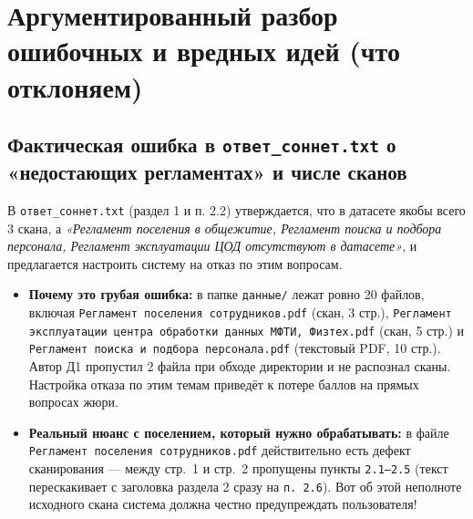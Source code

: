 \documentclass[10pt,a4paper]{article}
\begin{document}
\section{Аргументированный разбор ошибочных и вредных идей (что отклоняем)}

\subsection{Фактическая ошибка в \texttt{ответ\_соннет.txt} о «недостающих регламентах» и числе сканов}
В \texttt{ответ\_соннет.txt} (раздел 1 и п. 2.2) утверждается, что в датасете якобы всего 3 скана, а \emph{«Регламент поселения в общежитие, Регламент поиска и подбора персонала, Регламент эксплуатации ЦОД отсутствуют в датасете»}, и предлагается настроить систему на отказ по этим вопросам.
\begin{itemize}
    \item \textbf{Почему это грубая ошибка:} в папке \texttt{данные/} лежат ровно 20 файлов, включая \texttt{Регламент поселения сотрудников.pdf} (скан, 3 стр.), \texttt{Регламент эксплуатации центра обработки данных МФТИ, Физтех.pdf} (скан, 5 стр.) и \texttt{Регламент поиска и подбора персонала.pdf} (текстовый PDF, 10 стр.). Автор Д1 пропустил 2 файла при обходе директории и не распознал сканы. Настройка отказа по этим темам приведёт к потере баллов на прямых вопросах жюри.
    \item \textbf{Реальный нюанс с поселением, который нужно обрабатывать:} в файле \texttt{Регламент поселения сотрудников.pdf} действительно есть дефект сканирования — между стр.~1 и стр.~2 пропущены пункты \texttt{2.1--2.5} (текст перескакивает с заголовка раздела 2 сразу на \texttt{п. 2.6}). Вот об этой неполноте исходного скана система должна честно предупреждать пользователя!
\end{itemize}
\end{document}

